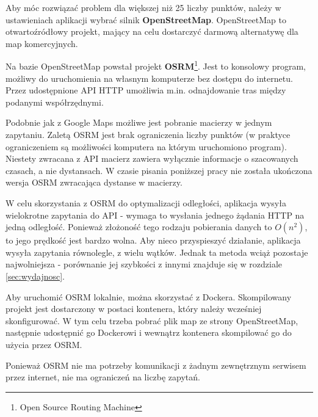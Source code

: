 Aby móc rozwiązać problem dla większej niż 25 liczby punktów, należy w ustawieniach aplikacji wybrać silnik \textbf{OpenStreetMap}. OpenStreetMap to otwartoźródłowy projekt, mający na celu dostarczyć darmową alternatywę dla map komercyjnych.

Na bazie OpenStreetMap powstał projekt \textbf{OSRM}\footnote{Open Source Routing Machine}. Jest to konsolowy program, możliwy do uruchomienia na własnym komputerze bez dostępu do internetu. Przez udostępnione API HTTP umożliwia m.in. odnajdowanie tras między podanymi współrzędnymi.

Podobnie jak z Google Maps możliwe jest pobranie macierzy w jednym zapytaniu. Zaletą OSRM jest brak ograniczenia liczby punktów (w praktyce ograniczeniem są możliwości komputera na którym uruchomiono program). Niestety zwracana z API macierz zawiera wyłącznie informacje o szacowanych czasach, a nie dystansach. W czasie pisania poniższej pracy nie została ukończona wersja OSRM zwracająca dystanse w macierzy.

W celu skorzystania z OSRM do optymalizacji odległości, aplikacja wysyła wielokrotne zapytania do API - wymaga to wysłania jednego żądania HTTP na jedną odległość. Ponieważ złożoność tego rodzaju pobierania danych to $O(n^{2})$, to jego prędkość jest bardzo wolna. Aby nieco przyspieszyć działanie, aplikacja wysyła zapytania równolegle, z wielu wątków. Jednak ta metoda wciąż pozostaje najwolniejsza - porównanie jej szybkości z innymi znajduje się w rozdziale \ref{sec:wydajnosc}.

Aby uruchomić OSRM lokalnie, można skorzystać z Dockera. Skompilowany projekt jest dostarczony w postaci kontenera, który należy wcześniej skonfigurować. W tym celu trzeba pobrać plik map ze strony OpenStreetMap, następnie udostępnić go Dockerowi i wewnątrz kontenera skompilować go do użycia przez OSRM.

Ponieważ OSRM nie ma potrzeby komunikacji z żadnym zewnętrznym serwisem przez internet, nie ma ograniczeń na liczbę zapytań.